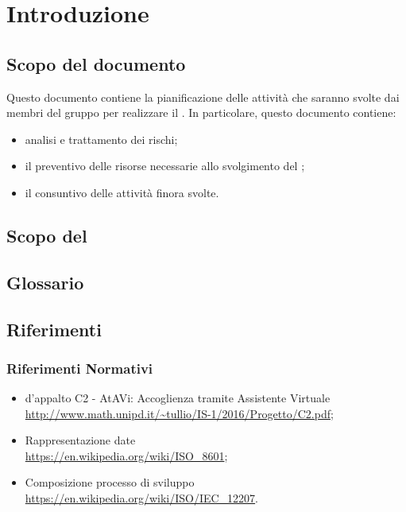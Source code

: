 \section{Introduzione}
	\subsection{Scopo del documento}
	Questo documento contiene la pianificazione delle attività che saranno svolte dai membri del gruppo \GRUPPO{} per realizzare il  \PROGETTO. In particolare, questo documento contiene:
	\begin{itemize}
		\item analisi e trattamento dei rischi;
		\item il preventivo delle risorse necessarie allo svolgimento del ;
		\item il consuntivo delle attività finora svolte.
	\end{itemize}	
	\subsection{Scopo del }
		\SCOPO
	\subsection{Glossario}
		\GLOSSARIO
	\subsection{Riferimenti}
	\subsubsection{Riferimenti Normativi}
		\begin{itemize}
			\item {} d'appalto C2 - AtAVi: Accoglienza tramite Assistente Virtuale \\
			\url{http://www.math.unipd.it/~tullio/IS-1/2016/Progetto/C2.pdf};
			\item Rappresentazione date \\
			\url{https://en.wikipedia.org/wiki/ISO_8601};
			\item Composizione processo di sviluppo \\
			\url{https://en.wikipedia.org/wiki/ISO/IEC_12207}.

	\end{itemize}
